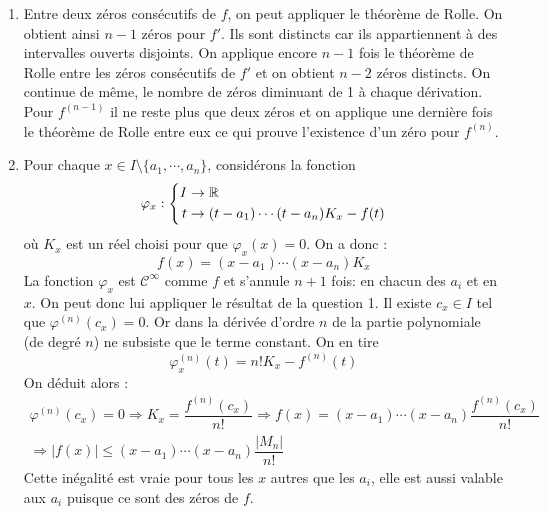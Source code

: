 \begin{enumerate}
 \item Entre deux zéros consécutifs de $f$, on peut appliquer le théorème de Rolle. On obtient ainsi $n-1$ zéros pour $f'$. Ils sont distincts car ils appartiennent à des intervalles ouverts disjoints. On applique encore $n-1$ fois le théorème de Rolle entre les zéros consécutifs de $f'$ et on obtient $n-2$ zéros distincts. On continue de même, le nombre de zéros diminuant de 1 à chaque dérivation.\newline
Pour $f^{(n-1)}$ il ne reste plus que deux zéros et on applique une dernière fois le théorème de Rolle entre eux ce qui prouve l'existence d'un zéro pour $f^{(n)}$.
\item Pour chaque $x\in I\setminus\{a_1,\cdots,a_n\}$, considérons la fonction
\begin{displaymath}
 \varphi_x : \left\lbrace
\begin{aligned}
I &\rightarrow \mathbb{R} \\
t &\rightarrow (t-a_1) \cdots (t-a_n)K_x -f(t)
 \end{aligned}
 \right. 
\end{displaymath}
où $K_x$ est un réel choisi pour que $\varphi_x(x)=0$. On a donc :
\begin{displaymath}
 f(x) = (x-a_1)\cdots (x-a_n)K_x
\end{displaymath}
La fonction $\varphi_x$ est $\mathcal C^{\infty}$ comme $f$ et s'annule $n+1$ fois: en chacun des $a_i$ et en $x$. On peut donc lui appliquer le résultat de la question 1.\newline
Il existe $c_x\in I$ tel que $\varphi^{(n)}(c_x)=0$. Or dans la dérivée d'ordre $n$ de la partie polynomiale (de degré $n$) ne subsiste que le terme constant. On en tire
\begin{displaymath}
 \varphi_x^{(n)}(t) = n! K_x - f^{(n)}(t)
\end{displaymath}
On déduit alors :
\begin{multline*}
\varphi^{(n)}(c_x)=0 \Rightarrow K_x = \dfrac{f^{(n)}(c_x)}{n!}
\Rightarrow  f(x) = (x-a_1)\cdots (x-a_n)\dfrac{f^{(n)}(c_x)}{n!} \\
\Rightarrow |f(x)| \leq (x-a_1)\cdots (x-a_n)\dfrac{|M_n|}{n!}
\end{multline*}
Cette inégalité est vraie pour tous les $x$ autres que les $a_i$, elle est aussi valable aux $a_i$ puisque ce sont des zéros de $f$.


\end{enumerate}
